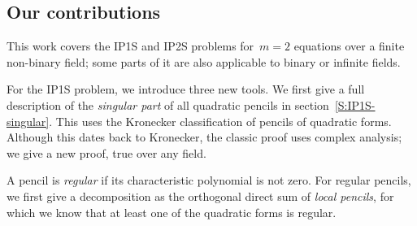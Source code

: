 \documentclass{article}%
\def\transpose#1{{\vphantom{#1}}^{\mathrm{t}}\!#1}
\begin{document}


\subsection*{Our contributions}%
This work covers the IP1S and IP2S problems for~$m = 2$ equations over a
finite non-binary field; some parts of it are also applicable to binary
or infinite fields.

For the IP1S problem, we introduce three new tools. We first give a full
description of the \emph{singular part} of all quadratic pencils in
section~\ref{S:IP1S-singular}. This uses the Kronecker classification of
pencils of quadratic forms. Although this dates back to Kronecker, the
classic proof uses complex analysis; we give a new proof, true over any
field.

A pencil is \emph{regular} if its characteristic polynomial is not zero.
For regular pencils, we first give a decomposition as the orthogonal
direct sum of \emph{local pencils}, for which we know that at least one
of the quadratic forms is regular.
\end{document}
